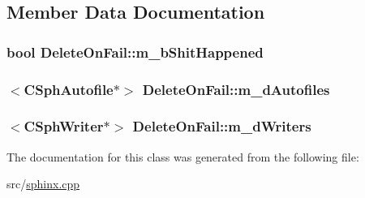 \subsection{Member Data Documentation}
\hypertarget{classDeleteOnFail_aedc3cf679b2d1132fbefb55901176f8c}{
\subsubsection[{m\-\_\-b\-Shit\-Happened}]{\setlength{\rightskip}{0pt plus 5cm}bool Delete\-On\-Fail\-::m\-\_\-b\-Shit\-Happened\hspace{0.3cm}{\ttfamily [private]}}}\label{classDeleteOnFail_aedc3cf679b2d1132fbefb55901176f8c}
\hypertarget{classDeleteOnFail_a5a24acb68805170e1dfa419a85ad062e}{
\subsubsection[{m\-\_\-d\-Autofiles}]{$<${\bf C\-Sph\-Autofile}$\ast$$>$ Delete\-On\-Fail\-::m\-\_\-d\-Autofiles\hspace{0.3cm}{\ttfamily [private]}}}\label{classDeleteOnFail_a5a24acb68805170e1dfa419a85ad062e}
\hypertarget{classDeleteOnFail_ad5410b6541b7149046f73615ff23d5fb}{
\subsubsection[{m\-\_\-d\-Writers}]{$<${\bf C\-Sph\-Writer}$\ast$$>$ Delete\-On\-Fail\-::m\-\_\-d\-Writers\hspace{0.3cm}{\ttfamily [private]}}}\label{classDeleteOnFail_ad5410b6541b7149046f73615ff23d5fb}


The documentation for this class was generated from the following file\-:\begin{DoxyCompactItemize}
\item 
src/\hyperlink{sphinx_8cpp}{sphinx.\-cpp}\end{DoxyCompactItemize}
